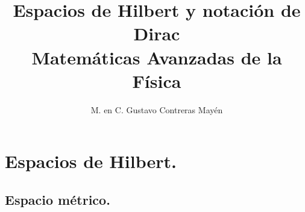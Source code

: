 
\title{Espacios de Hilbert y notación de Dirac \\ \large {Matemáticas Avanzadas de la Física}  \vspace{-3ex}}

\author{M. en C. Gustavo Contreras Mayén}
\date{ }

\pagestyle{fancy}
\fancyhf{}
\lhead{\leftmark}
\rfoot{\thepage}
\setlength{\headheight}{16pt}%



\maketitle
\fontsize{14}{14}\selectfont
\tableofcontents
\newpage


\section{Espacios de Hilbert.}
\subsection{Espacio métrico.}

